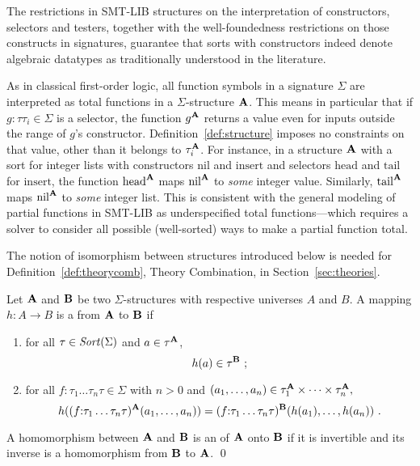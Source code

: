 \begin{remark}
The restrictions in SMT-LIB structures on the interpretation 
of constructors, selectors and testers,
together with the well-foundedness restrictions on those constructs in signatures,
guarantee that sorts with constructors indeed denote algebraic datatypes
as traditionally understood in the literature.
\end{remark}

\begin{remark}
As in classical first-order logic, all function symbols in a signature $\Sigma$ 
are interpreted as total functions in a $\Sigma$-structure $\mathbf{A}$.  
This means in particular that if $g{:}\tau\tau_i \in \Sigma$ is a selector,
the function $g^{\mathbf{A}}$ returns a value even for inputs
outside the range of $g$'s constructor.
Definition~\ref{def:structure} imposes no constraints on that value,
other than it belongs to $\tau_i^{\mathbf{A}}$.
For instance, in a structure $\mathbf{A}$ with a sort for integer lists with constructors
$\mathrm{nil}$ and $\mathrm{insert}$ and 
selectors $\mathrm{head}$ and $\mathrm{tail}$ for $\mathrm{insert}$,
the function $\mathrm{head}^{\mathbf{A}}$ maps $\mathrm{nil}^{\mathbf{A}}$ 
to \emph{some} integer value.
Similarly,
$\mathrm{tail}^{\mathbf{A}}$ maps $\mathrm{nil}^{\mathbf{A}}$ to \emph{some} integer list.
This is consistent with the general modeling of partial functions 
in SMT-LIB as underspecified total functions---which requires a solver 
to consider all possible (well-sorted) ways to make a partial function total.
\end{remark}


The notion of isomorphism between structures introduced below 
is needed for Definition~\ref{def:theorycomb}, Theory Combination,
in Section~\ref{sec:theories}.

\begin{definition}[Isomorphism]
Let $\mathbf{A}$ and $\mathbf{B}$ be two $\Sigma$-structures 
with respective universes $A$ and $B$.
A mapping $h:A \to B$ is a  from $\mathbf{A}$ to $\mathbf{B}$
if
\begin{enumerate}
\item
for all $\tau \in \mathit{Sort}(\Sigma)$ and $a \in \tau^{\mathbf{A}}$,
\[
 h(a) \in  \tau^{\str B}\ ;
\]
\item
for all $f{:}\tau_1\ldots\tau_n\tau \in \Sigma$ with $n > 0$
and 
\(
 (a_1, \ldots, a_n) \in 
 \tau_1^{\mathbf{A}} \times \cdots \times \tau_n^{\mathbf{A}} ,
\)
\[
 h((f{:}\tau_1\ldots\tau_n\tau)^{\str A}(a_1, \ldots, a_n)) = 
 (f{:}\tau_1\ldots\tau_n\tau)^{\str B}(h(a_1), \ldots, h(a_n)) \ . 
\]
\end{enumerate}
%
A homomorphism between $\mathbf{A}$ and $\mathbf{B}$ is 
an  of $\mathbf{A}$ onto $\mathbf{B}$
if it is invertible and its inverse is a homomorphism from $\mathbf{B}$ to $\mathbf{A}$. 
\qed
\end{definition}

